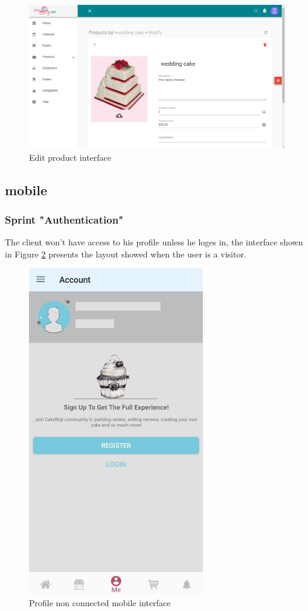 \documentclass[12pt,a4paper]{report}
\begin{document}
\begin{figure}[H]
	\vspace*{1in}
	\centering
	\includegraphics[width=7in,keepaspectratio]{editproduct.png}
	\caption{Edit product interface}
	\label{editproduct-interface}
\end{figure} 
\clearpage
\subsection{mobile}
\subsubsection*{Sprint "Authentication"}
The client won't have access to his profile unless he loges in, the interface shown in Figure \ref{accountnonconnect-mobile-interface} presents the layout showed when the user is a visitor.

\begin{figure}[H]
	\vspace*{1in}
	\centering
	\includegraphics[width=3in,keepaspectratio]{accountnotconnectedlogin.jpg}
	\caption{Profile non connected mobile interface}
	\label{accountnonconnect-mobile-interface}
\end{figure} 
\end{document}
